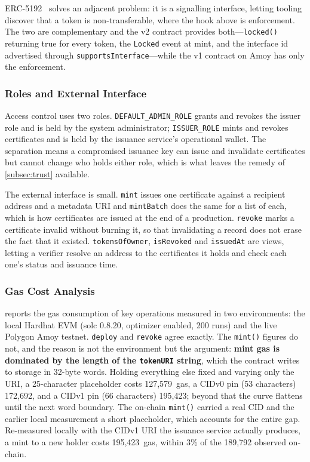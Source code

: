 ERC-5192~\cite{daubenschuetz2022erc5192} solves an adjacent problem: it is a
signalling interface, letting tooling discover that a token is non-transferable,
where the hook above is enforcement. The two are complementary and the v2 contract
provides both---\texttt{locked()} returning true for every token, the
\texttt{Locked} event at mint, and the interface id advertised through
\texttt{supportsInterface}---while the v1 contract on Amoy has only the
enforcement.

\subsubsection{Roles and External Interface}

Access control uses two roles. \texttt{DEFAULT\_ADMIN\_ROLE} grants and revokes the
issuer role and is held by the system administrator; \texttt{ISSUER\_ROLE} mints and
revokes certificates and is held by the issuance service's operational wallet. The
separation means a compromised issuance key can issue and invalidate certificates but
cannot change who holds either role, which is what leaves the remedy of
\cref{subsec:trust} available.

The external interface is small. \texttt{mint} issues one certificate against a
recipient address and a metadata URI and \texttt{mintBatch} does the same for a list
of each, which is how certificates are issued at the end of a production.
\texttt{revoke} marks a certificate invalid without burning it, so that invalidating a
record does not erase the fact that it existed. \texttt{tokensOfOwner},
\texttt{isRevoked} and \texttt{issuedAt} are views, letting a verifier resolve an
address to the certificates it holds and check each one's status and issuance time.

\subsubsection{Gas Cost Analysis}

 reports the gas consumption of key operations measured in two
environments: the local Hardhat EVM (solc 0.8.20, optimizer enabled, 200 runs) and
the live Polygon Amoy testnet. \texttt{deploy} and \texttt{revoke} agree exactly.
The \texttt{mint()} figures do not, and the reason is not the environment but the
argument: \textbf{mint gas is dominated by the length of the \texttt{tokenURI}
string}, which the contract writes to storage in 32-byte words. Holding everything
else fixed and varying only the URI, a 25-character placeholder costs
127{,}579~gas, a CIDv0 pin (53 characters) 172{,}692, and a CIDv1 pin
(66 characters) 195{,}423; beyond that the curve flattens until the next word
boundary. The on-chain \texttt{mint()} carried a real CID and the earlier local
measurement a short placeholder, which accounts for the entire gap. Re-measured
locally with the CIDv1 URI the issuance service actually produces, a mint to a new
holder costs 195{,}423~gas, within 3\% of the 189{,}792 observed on-chain.

